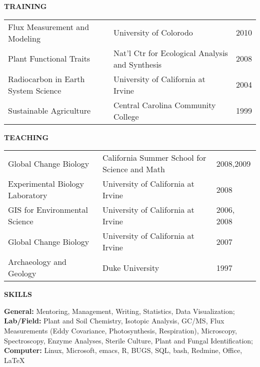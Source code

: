 \documentclass[11pt,twoside]{article}
\begin{document}
\textbf{TRAINING}%
\vspace{-0.5em}

\begin{table}[h]
\begin{tabular}{  >{\raggedright}p{18.0em}<{}  >{\raggedright}p{20.0em}<{}    l } 
 Flux Measurement and Modeling& University of Colorodo & 2010  \\
 Plant Functional Traits& Nat'l Ctr for Ecological Analysis and Synthesis& 2008\\
 Radiocarbon in Earth System Science& University of California at Irvine& 2004\\
 Sustainable Agriculture& Central Carolina Community College&1999\\ 
\end{tabular}
\end{table}
\vspace{-0.5em}
\textbf{TEACHING}
\vspace{-0.5em}
\begin{table}[h!]
\begin{tabular}{ >{\raggedright}p{18.0em}<{}  >{\raggedright}p{20.0em}<{} l } 
 Global Change Biology& California Summer School for Science and Math&2008,2009\\
 Experimental Biology Laboratory& University of California at Irvine &2008\\
 GIS for Environmental Science& University of California at Irvine& 2006, 2008\\
 Global Change Biology& University of California at Irvine& 2007\\
 Archaeology and Geology& Duke University & 1997\\
\end{tabular}
\end{table}
\vspace{-0.5em}

\textbf{SKILLS}
\vspace{0.5em}

\textbf{General:}  Mentoring, Management, Writing, Statistics, Data Visualization;
\textbf{Lab/Field:}  Plant and Soil Chemistry, Isotopic Analysis, GC/MS, Flux Measurements (Eddy Covariance, Photosynthesis, Respiration), Microscopy, Spectroscopy, Enzyme Analyses, Sterile Culture, Plant and Fungal Identification;
\textbf{Computer:} Linux, Microsoft, emacs, R, BUGS, SQL, bash, Redmine, Office, \LaTeX
\end{document}
